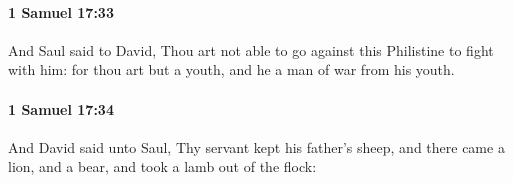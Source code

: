 		\paragraph{1 Samuel 17:33} %
			\label{1SAMUEL-17-33}

			And Saul said to David, Thou art not able to go against this Philistine to fight with him: for thou art but a youth, and he a man of war from his youth.


		\paragraph{1 Samuel 17:34} %
			\label{1SAMUEL-17-34}

			And David said unto Saul, Thy servant kept his father’s sheep, and there came a lion, and a bear, and took a lamb out of the flock:



